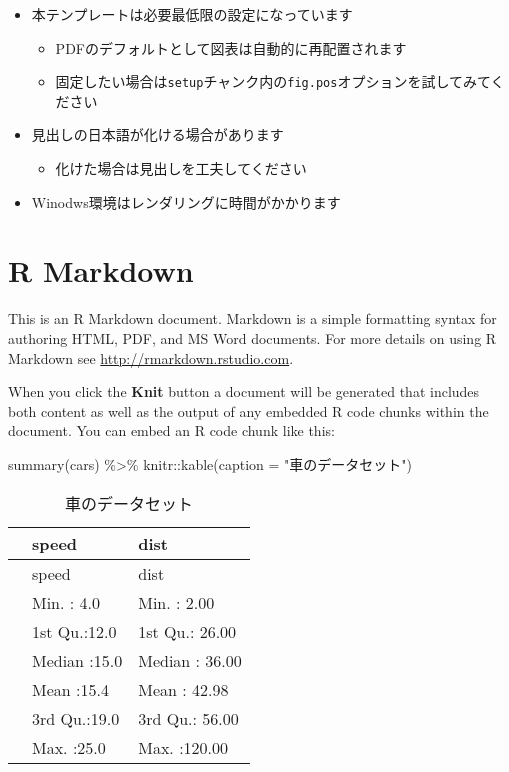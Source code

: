 \documentclass[
  12pt,
  xelatex,ja=standard]{bxjsarticle}
\newenvironment{Shaded}{\begin{snugshade}}{\end{snugshade}}
\newcommand{\AttributeTok}[1]{\textcolor[rgb]{0.77,0.63,0.00}{#1}}
\newcommand{\FunctionTok}[1]{\textcolor[rgb]{0.00,0.00,0.00}{#1}}
\newcommand{\NormalTok}[1]{#1}
\newcommand{\SpecialCharTok}[1]{\textcolor[rgb]{0.00,0.00,0.00}{#1}}
\newcommand{\StringTok}[1]{\textcolor[rgb]{0.31,0.60,0.02}{#1}}
\providecommand{\tightlist}{%
  \setlength{\itemsep}{0pt}\setlength{\parskip}{0pt}}
\begin{document}
\begin{itemize}
\tightlist
\item
  本テンプレートは必要最低限の設定になっています

  \begin{itemize}
  \tightlist
  \item
    PDFのデフォルトとして図表は自動的に再配置されます
  \item
    固定したい場合は\texttt{setup}チャンク内の\texttt{fig.pos}オプションを試してみてください
  \end{itemize}
\item
  見出しの日本語が化ける場合があります

  \begin{itemize}
  \tightlist
  \item
    化けた場合は見出しを工夫してください
  \end{itemize}
\item
  Winodws環境はレンダリングに時間がかかります
\end{itemize}

\hypertarget{r-markdown}{%
\section{R Markdown}\label{r-markdown}}

This is an R Markdown document. Markdown is a simple formatting syntax
for authoring HTML, PDF, and MS Word documents. For more details on
using R Markdown see \url{http://rmarkdown.rstudio.com}.

When you click the \textbf{Knit} button a document will be generated
that includes both content as well as the output of any embedded R code
chunks within the document. You can embed an R code chunk like this:

\begin{Shaded}
\begin{Highlighting}[numbers=left,,]
\FunctionTok{summary}\NormalTok{(cars) }\SpecialCharTok{\%\textgreater{}\%} 
\NormalTok{  knitr}\SpecialCharTok{::}\FunctionTok{kable}\NormalTok{(}\AttributeTok{caption =} \StringTok{"車のデータセット"}\NormalTok{)}
\end{Highlighting}
\end{Shaded}

\begin{longtable}[]{@{}lll@{}}
\caption{車のデータセット}\tabularnewline
\toprule
& speed & dist \\
\midrule
\endfirsthead
\toprule
& speed & dist \\
\midrule
\endhead
& Min. : 4.0 & Min. : 2.00 \\
& 1st Qu.:12.0 & 1st Qu.: 26.00 \\
& Median :15.0 & Median : 36.00 \\
& Mean :15.4 & Mean : 42.98 \\
& 3rd Qu.:19.0 & 3rd Qu.: 56.00 \\
& Max. :25.0 & Max. :120.00 \\
\bottomrule
\end{longtable}
\end{document}
